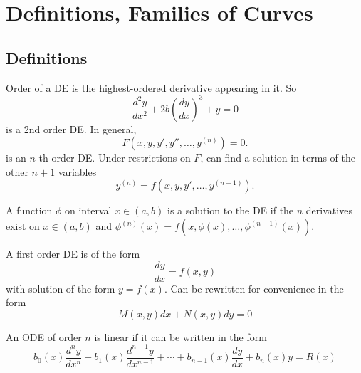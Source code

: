 \section{Definitions, Families of Curves}

\subsection{Definitions}

\begin{definition}[Order]
    Order of a DE is the highest-ordered derivative appearing in it.
    So
    \begin{equation*}
        \frac{d^2y}{dx^2}+2b(\frac{dy}{dx})^3+y=0
    \end{equation*}
    is a 2nd order DE. In general,
    \begin{equation*}
        F(x,y,y',y'',\ldots,y^{(n)})=0.
    \end{equation*}
    is an $n$-th order DE.
    Under restrictions on $F$, can find a solution in terms of the other $n+1$ variables
    \begin{equation*}
        y^{(n)}=f(x,y,y',\ldots,y^{(n-1)}).
    \end{equation*}
\end{definition}

\begin{definition}[Solution]
    A function $\phi$ on interval $x\in (a,b)$ is a solution to the DE
    if the $n$ derivatives exist on $x\in(a,b)$ and $\phi^{(n)}(x)=f(x,\phi(x),\ldots,\phi^{(n-1)}(x))$.
\end{definition}

\begin{definition}
    A first order DE is of the form
    \begin{equation*}
        \frac{dy}{dx}=f(x,y)
    \end{equation*}
    with solution of the form $y=f(x)$.
    Can be rewritten for convenience in the form
    \begin{equation*}
        M(x,y)dx+N(x,y)dy=0
    \end{equation*}
\end{definition}

\begin{definition}
    An ODE of order $n$ is linear if it can be written in the form
    \begin{equation*}
        b_0(x)\frac{d^ny}{dx^n}+b_1(x)\frac{d^{n-1}y}{dx^{n-1}}+\cdots+b_{n-1}(x)\frac{dy}{dx}+b_{n}(x)y=R(x)
    \end{equation*}
\end{definition}


